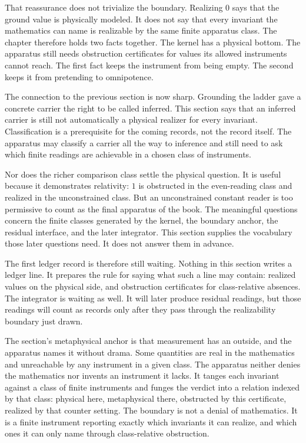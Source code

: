 That reassurance does not trivialize the boundary. Realizing \(0\) says that the
ground value is physically modeled. It does not say that every invariant the
mathematics can name is realizable by the same finite apparatus class. The
chapter therefore holds two facts together. The kernel has a physical bottom.
The apparatus still needs obstruction certificates for values its allowed
instruments cannot reach. The first fact keeps the instrument from being empty.
The second keeps it from pretending to omnipotence.

The connection to the previous section is now sharp. Grounding the ladder gave a
concrete carrier the right to be called inferred. This section says that an
inferred carrier is still not automatically a physical realizer for every
invariant. Classification is a prerequisite for the coming records, not the
record itself. The apparatus may classify a carrier all the way to inference and
still need to ask which finite readings are achievable in a chosen class of
instruments.

Nor does the richer comparison class settle the physical question. It is useful
because it demonstrates relativity: \(1\) is obstructed in the even-reading class
and realized in the unconstrained class. But an unconstrained constant reader is
too permissive to count as the final apparatus of the book. The meaningful
questions concern the finite classes generated by the kernel, the boundary
anchor, the residual interface, and the later integrator. This section supplies
the vocabulary those later questions need. It does not answer them in advance.

The first ledger record is therefore still waiting. Nothing in this section
writes a ledger line. It prepares the rule for saying what such a line may
contain: realized values on the physical side, and obstruction certificates for
class-relative absences. The integrator is waiting as well. It will later produce
residual readings, but those readings will count as records only after they pass
through the realizability boundary just drawn.

The section's metaphysical anchor is that measurement has an outside, and the
apparatus names it without drama. Some quantities are real in the mathematics and
unreachable by any instrument in a given class. The apparatus neither denies the
mathematics nor invents an instrument it lacks. It tanges each invariant against
a class of finite instruments and funges the verdict into a relation indexed by
that class: physical here, metaphysical there, obstructed by this certificate,
realized by that counter setting. The boundary is not a denial of mathematics.
It is a finite instrument reporting exactly which invariants it can realize, and
which ones it can only name through class-relative obstruction.

